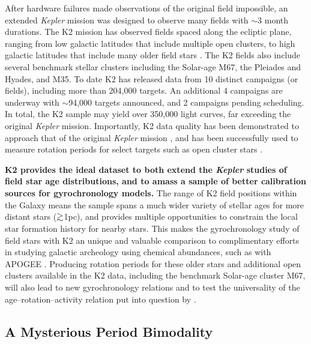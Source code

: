 \documentclass[12pt]{article}
\newcommand{\Kepler}{\textsl{Kepler}\xspace}
\def\gtrsim{\mathrel{\hbox{\rlap{\hbox{\lower3pt\hbox{$\sim$}}}\hbox{\raise2pt\hbox{$>$}}}}}
\begin{document}
After hardware failures made observations of the original field impossible, an extended \Kepler mission was designed to observe many fields with $\sim$3 month durations. The K2 mission has observed fields spaced along the ecliptic plane, ranging from low galactic latitudes that include multiple open clusters, to high galactic latitudes that include many older field stars \citep{howell2014}. The K2 fields also include several benchmark stellar clusters including the Solar-age M67, the Pleiades and Hyades, and M35. To date K2 has released data from 10 distinct campaigns (or fields), including more than 204,000 targets. An additional 4 campaigns are underway with $\sim$94,000 targets announced, and 2 campaigns pending scheduling. In total, the K2 sample may yield over 350,000 light curves, far exceeding the original \Kepler mission. Importantly, K2 data quality has been demonstrated to approach that of the original \Kepler mission \citep{luger2016}, and has been successfully used to measure rotation periods for select targets such as open cluster stars \citep[e.g.][]{douglas2017}.



{\bf K2 provides the ideal dataset to both extend the \Kepler studies of field star age distributions, and to amass a sample of better calibration sources for gyrochronology models.} The range of K2 field positions within the Galaxy means the sample spans a much wider variety of stellar ages for more distant stars ($\gtrsim$1pc), and provides multiple opportunities to constrain the local star formation history for nearby stars. This makes the gyrochronology study of field stars with K2 an unique and valuable comparison to complimentary efforts in studying galactic archeology using chemical abundances, such as with APOGEE \citep{hayden2014}.
Producing rotation periods for these older stars and additional open clusters available in the K2 data, including the benchmark Solar-age cluster M67, will also lead to new gyrochronology relations and to test the universality of the age--rotation--activity relation put into question by \citet{angus2015}.



\subsection{A Mysterious Period Bimodality}
\end{document}
